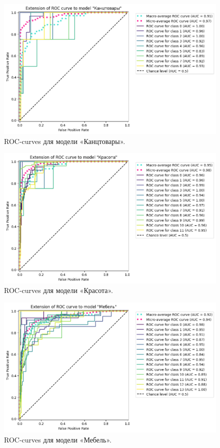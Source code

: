 \documentclass[a4paper,12pt]{extarticle}
\begin{document}
\begin{figure}[hbtp]
	\centering
	\includegraphics[scale=0.7]{roc_curves/roccurve_Канцтовары.png}
	\caption{ROC-curves для модели «Канцтовары».}
	\label{fig:roccurve_Канцтовары}
\end{figure}

\begin{figure}[hbtp]
	\centering
	\includegraphics[scale=0.7]{roc_curves/roccurve_Красота.png}
	\caption{ROC-curves для модели «Красота».}
	\label{fig:roccurve_Красота}
\end{figure}

\begin{figure}[hbtp]
	\centering
	\includegraphics[scale=0.7]{roc_curves/roccurve_Мебель.png}
	\caption{ROC-curves для модели «Мебель».}
	\label{fig:roccurve_Мебель}
\end{figure}
\end{document}
